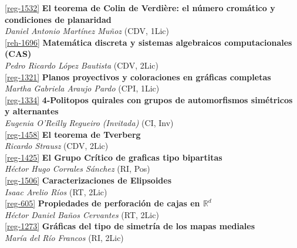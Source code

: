 \begin{multicols}{2}
\noindent  \ref{reg-1532}  {\bfseries El teorema de Colin de Verdi\`ere: el n\'umero crom\'atico y condiciones de planaridad}\\
{\slshape  Daniel Antonio Mart\'inez Mu\~noz} {\footnotesize (CDV, 1Lic)}\\

\noindent  \ref{reh-1696}  {\bfseries Matem\'atica discreta y sistemas algebraicos computacionales (CAS)}\\
{\slshape  Pedro Ricardo L\'opez Bautista} {\footnotesize (CDV, 2Lic)}\\

\noindent  \ref{reg-1321}  {\bfseries Planos proyectivos y coloraciones en gr\'aficas completas}\\
{\slshape  Martha Gabriela Araujo Pardo} {\footnotesize (CPI, 1Lic)}\\

\noindent  \ref{reg-1334}  {\bfseries 4-Politopos quirales con grupos de automorfismos sim\'etricos y alternantes}\\
{\slshape  Eugenia  O'Reilly Regueiro (Invitada)} {\footnotesize (CI, Inv)}\\

\noindent  \ref{reg-1458}  {\bfseries El teorema de Tverberg}\\
{\slshape  Ricardo  Strausz} {\footnotesize (CDV, 2Lic)}\\

\noindent  \ref{reg-1425}  {\bfseries El Grupo Cr\'itico de graficas tipo bipartitas}\\
{\slshape  H\'ector Hugo Corrales S\'anchez} {\footnotesize (RI, Pos)}\\

\noindent  \ref{reg-1506}  {\bfseries Caracterizaciones de Elipsoides}\\
{\slshape  Isaac Arelio R\'ios} {\footnotesize (RT, 2Lic)}\\

\noindent  \ref{reg-605}  {\bfseries Propiedades de perforaci\'on de cajas en $\mathbb{R}^d$}\\
{\slshape  H\'ector Daniel Ba\~nos Cervantes} {\footnotesize (RT, 2Lic)}\\

\noindent  \ref{reg-1273}  {\bfseries Gr\'aficas del tipo de simetr\'ia de los mapas mediales}\\
{\slshape  Mar\'ia  del R\'io Francos} {\footnotesize (RI, 2Lic)}\\


\end{multicols}
